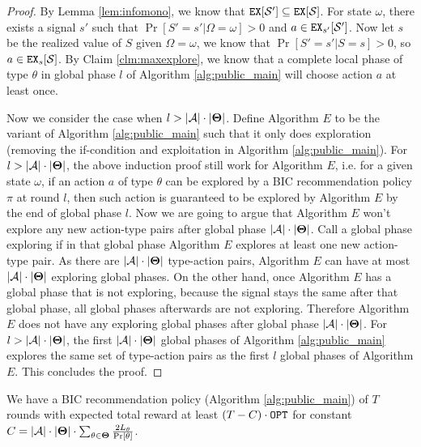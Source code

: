 \begin{proof}
By Lemma \ref{lem:infomono}, we know that $\mathtt{EX}[\mathcal{S}'] \subseteq \mathtt{EX}[\mathcal{S}]$. For state $\omega$, there exists a signal $s'$ such that $\Pr[S'=s'|\Omega =\omega] >0 $ and $a \in \mathtt{EX}_{s'} [\mathcal{S}']$. Now let $s$ be the realized value of $S$ given $\Omega = \omega$, we know that $\Pr[S'=s'|S=s] >0$, so $a \in \mathtt{EX}_s[\mathcal{S}]$. By Claim \ref{clm:maxexplore}, we know that a complete local phase of type $\theta$ in global phase $l$ of Algorithm \ref{alg:public_main} will choose action $a$ at least once.

Now we consider the case when $l > |\mathcal{A}| \cdot |\bold{\Theta}|$. Define Algorithm $E$ to be the variant of Algorithm \ref{alg:public_main} such that it only does exploration (removing the if-condition and exploitation in Algorithm \ref{alg:public_main}). For $l > |\mathcal{A}| \cdot |\bold{\Theta}|$, the above induction proof still work for Algorithm $E$, i.e. for a given state $\omega$, if an action $a$ of type $\theta$ can be explored by a BIC recommendation policy $\pi$ at round $l$, then such action is guaranteed to be explored by Algorithm $E$ by the end of global phase $l$. Now we are going to argue that Algorithm $E$ won't explore any new action-type pairs after global phase $|\mathcal{A}| \cdot |\bold{\Theta}|$. Call a global phase exploring if in that global phase Algorithm $E$ explores at least one new action-type pair. As there are  $ |\mathcal{A}| \cdot |\bold{\Theta}|$ type-action pairs, Algorithm $E$ can have at most $ |\mathcal{A}| \cdot |\bold{\Theta}|$ exploring global phases. On the other hand, once Algorithm $E$ has a global phase that is not exploring, because the signal stays the same after that global phase, all global phases afterwards are not exploring. Therefore Algorithm $E$ does not have any exploring global phases after global phase $|\mathcal{A}| \cdot |\bold{\Theta}|$. For $l > |\mathcal{A}| \cdot |\bold{\Theta}|$, the first $|   \mathcal{A}| \cdot |\bold{\Theta}|$  global phases of Algorithm \ref{alg:public_main} explores the same set of type-action pairs as the first $l$ global phases of Algorithm $E$. This concludes the proof.
\end{proof}

\begin{corollary}
\label{cor:public}
We have a BIC recommendation policy (Algorithm \ref{alg:public_main}) of $T$ rounds with expected total reward at least $\left(T - C \right) \cdot \mathtt{OPT}$ for constant $C = |\mathcal{A}| \cdot |\bold{\Theta}| \cdot \sum_{\theta\in\bold{\Theta}} \frac{2L_{\theta}}{\Pr[\theta]}$.
\end{corollary}

